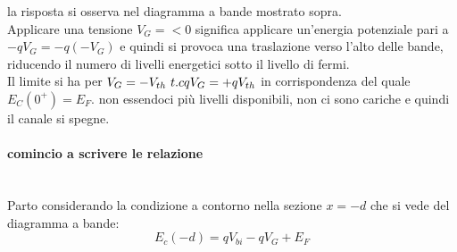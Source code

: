 \begin{exbox}
    la risposta si osserva nel diagramma a bande mostrato sopra.\\
    Applicare una tensione $V_G=<0$ significa applicare un'energia potenziale pari a $-qV_G= -q(-V_{G})$ e quindi si provoca una traslazione verso l'alto delle bande, riducendo il numero di livelli energetici sotto il livello di fermi.\\
    Il limite si ha per $V_G=-V_{th}\ t.c \-qV_G= + q V_{th}$ in corrispondenza del quale $E_C(0^+)=E_F$. non essendoci più livelli disponibili, non ci sono cariche e quindi il canale si spegne. 
\end{exbox} 

\paragraph{comincio a scrivere le relazione}\mbox{}\\
Parto considerando la condizione a contorno nella sezione $x=-d$ che si vede del diagramma a bande:
\begin{equation}
    E_c(-d)=qV_{bi}-qV_G+E_F
\end{equation}
